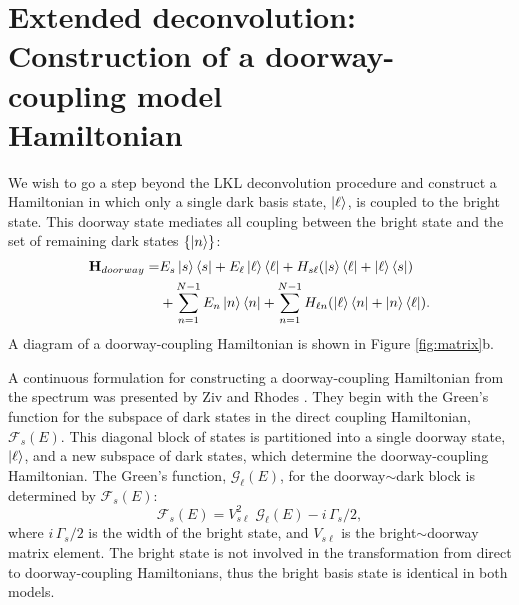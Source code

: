 
\section{Extended deconvolution: \\
  Construction of a doorway-coupling model \\Hamiltonian}

We wish to go a step beyond the LKL deconvolution procedure and
construct a Hamiltonian in which only a single dark basis state,
$\mathinner{|{\ell}\rangle}$, is coupled to the bright state.  This doorway state
mediates all coupling between the bright state and the set of
remaining dark states $\lbrace \mathinner{|{n}\rangle} \rbrace$:
\begin{equation}
  \begin{split}
    \mathbf{H}_{doorway} =&
    E_s\mathinner{|{s}\rangle}\mathinner{\langle{s}|}
    + E_{\ell}\mathinner{|{\ell}\rangle}\mathinner{\langle{\ell}|}
    + H_{s\ell} ( \mathinner{|{s}\rangle}\mathinner{\langle{\ell}|} + \mathinner{|{\ell}\rangle}\mathinner{\langle{s}|} ) \\
    & + \sum_{n=1}^{N-1} E_n\mathinner{|{n}\rangle}\mathinner{\langle{n}|}
    + \sum_{n=1}^{N-1} H_{\ell n} (\mathinner{|{\ell}\rangle}\mathinner{\langle{n}|} + \mathinner{|{n}\rangle}\mathinner{\langle{\ell}|}).
  \end{split}
\end{equation}
A diagram of a doorway-coupling Hamiltonian is shown in Figure
\ref{fig:matrix}b.

A continuous formulation for constructing a doorway-coupling
Hamiltonian from the spectrum was presented by Ziv and Rhodes
\cite{ziv76}.  They begin with the Green's function for the subspace
of dark states in the direct coupling Hamiltonian, $\mathcal{F}_s(E)$.
This diagonal block of states is partitioned into a single doorway
state, $\mathinner{|{\ell}\rangle}$, and a new subspace of dark states, which
determine the doorway-coupling Hamiltonian.  The Green's function,
$\mathcal{G}_{\ell}(E)$, for the doorway$\sim$dark block is determined
by $\mathcal{F}_s(E)$:
\begin{equation}
  \label{eq:green-doorway}
  \mathcal{F}_s(E) = V_{s\ell}^2 \; \mathcal{G}_{\ell}(E) - i \, \Gamma_s / 2,
\end{equation}
where $i \, \Gamma_s / 2$ is the width of the bright state, and
$V_{s\ell}$ is the bright$\sim$doorway matrix element.  The bright
state is not involved in the transformation from direct to
doorway-coupling Hamiltonians, thus the bright basis state is
identical in both models.

